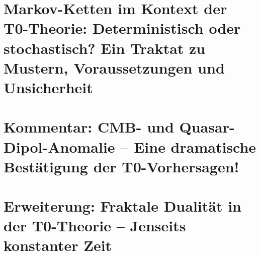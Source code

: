 \documentclass[11pt,openright,twoside]{book}
\begin{document}
\chapter{Markov-Ketten im Kontext der T0-Theorie: Deterministisch oder stochastisch? Ein Traktat zu Mustern, Voraussetzungen und Unsicherheit}


\chapter{Kommentar: CMB- und Quasar-Dipol-Anomalie -- Eine dramatische Bestätigung der T0-Vorhersagen!}


\chapter{Erweiterung: Fraktale Dualität in der T0-Theorie – Jenseits konstanter Zeit}

\end{document}
